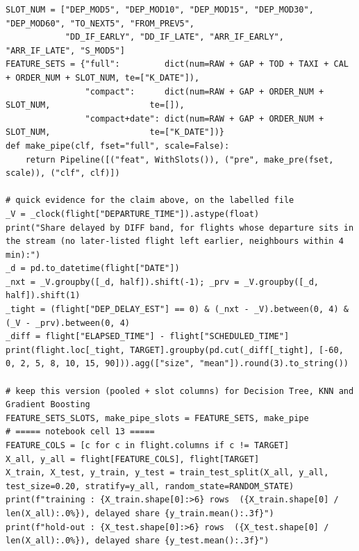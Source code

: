 \documentclass[12pt,a4paper]{article}
\begin{document}
\begin{lstlisting}[style=code]
SLOT_NUM = ["DEP_MOD5", "DEP_MOD10", "DEP_MOD15", "DEP_MOD30", "DEP_MOD60", "TO_NEXT5", "FROM_PREV5",
            "DD_IF_EARLY", "DD_IF_LATE", "ARR_IF_EARLY", "ARR_IF_LATE", "S_MOD5"]
FEATURE_SETS = {"full":         dict(num=RAW + GAP + TOD + TAXI + CAL + ORDER_NUM + SLOT_NUM, te=["K_DATE"]),
                "compact":      dict(num=RAW + GAP + ORDER_NUM + SLOT_NUM,                    te=[]),
                "compact+date": dict(num=RAW + GAP + ORDER_NUM + SLOT_NUM,                    te=["K_DATE"])}
def make_pipe(clf, fset="full", scale=False):
    return Pipeline([("feat", WithSlots()), ("pre", make_pre(fset, scale)), ("clf", clf)])

# quick evidence for the claim above, on the labelled file
_V = _clock(flight["DEPARTURE_TIME"]).astype(float)
print("Share delayed by DIFF band, for flights whose departure sits in the stream (no later-listed flight left earlier, neighbours within 4 min):")
_d = pd.to_datetime(flight["DATE"])
_nxt = _V.groupby([_d, half]).shift(-1); _prv = _V.groupby([_d, half]).shift(1)
_tight = (flight["DEP_DELAY_EST"] == 0) & (_nxt - _V).between(0, 4) & (_V - _prv).between(0, 4)
_diff = flight["ELAPSED_TIME"] - flight["SCHEDULED_TIME"]
print(flight.loc[_tight, TARGET].groupby(pd.cut(_diff[_tight], [-60, 0, 2, 5, 8, 10, 15, 90])).agg(["size", "mean"]).round(3).to_string())

# keep this version (pooled + slot columns) for Decision Tree, KNN and Gradient Boosting
FEATURE_SETS_SLOTS, make_pipe_slots = FEATURE_SETS, make_pipe
# ===== notebook cell 13 =====
FEATURE_COLS = [c for c in flight.columns if c != TARGET]
X_all, y_all = flight[FEATURE_COLS], flight[TARGET]
X_train, X_test, y_train, y_test = train_test_split(X_all, y_all, test_size=0.20, stratify=y_all, random_state=RANDOM_STATE)
print(f"training : {X_train.shape[0]:>6} rows  ({X_train.shape[0] / len(X_all):.0%}), delayed share {y_train.mean():.3f}")
print(f"hold-out : {X_test.shape[0]:>6} rows  ({X_test.shape[0] / len(X_all):.0%}), delayed share {y_test.mean():.3f}")
\end{lstlisting}
\end{document}
